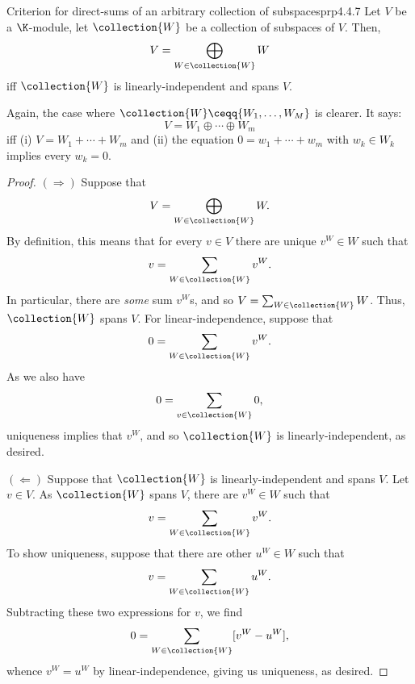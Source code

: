 \begin{prp}{Criterion for direct-sums of an arbitrary collection of subspaces}{prp4.4.7}
	Let $V$ be a $\K$-module, let $\collection{W}$ be a collection of subspaces of $V$.  Then,
	\begin{equation}
		V=\bigoplus _{W\in \collection{W}}W
	\end{equation}
	iff $\collection{W}$ is linearly-independent and spans $V$.
	\begin{rmk}
		Again, the case where $\collection{W}\ceqq \{ W_1,\ldots ,W_M\}$ is clearer.  It says:
		\begin{equation}
			V=W_1\oplus \cdots \oplus W_m
		\end{equation}
		iff (i) $V=W_1+\cdots +W_m$ and (ii) the equation $0=w_1+\cdots +w_m$ with $w_k\in W_k$ implies every $w_k=0$.
	\end{rmk}
	\begin{proof}
		$(\Rightarrow )$ Suppose that
		\begin{equation}
			V=\bigoplus _{W\in \collection{W}}W.
		\end{equation}
		By definition, this means that for every $v\in V$ there are unique $v^W\in W$ such that
		\begin{equation}
			v=\sum _{W\in \collection{W}}v^W.
		\end{equation}
		In particular, there are \emph{some} sum $v^W$s, and so $V=\sum _{W\in \collection{W}}W$.  Thus, $\collection{W}$ spans $V$.  For linear-independence, suppose that
		\begin{equation}
			0=\sum _{W\in \collection{W}}v^W.
		\end{equation}
		As we also have
		\begin{equation}
			0=\sum _{v\in \collection{W}}0,
		\end{equation}
		uniqueness implies that $v^W$, and so $\collection{W}$ is linearly-independent, as desired.
		
		\blni
		$(\Leftarrow )$ Suppose that $\collection{W}$ is linearly-independent and spans $V$.  Let $v\in V$.  As $\collection{W}$ spans $V$, there are $v^W\in W$ such that
		\begin{equation}
			v=\sum _{W\in \collection{W}}v^W.
		\end{equation}
		To show uniqueness, suppose that there are other $u^W\in W$ such that
		\begin{equation}
			v=\sum _{W\in \collection{W}}u^W.
		\end{equation}
		Subtracting these two expressions for $v$, we find
		\begin{equation}
			0=\sum _{W\in \collection{W}}[v^W-u^W],
		\end{equation}
		whence $v^W=u^W$ by linear-independence, giving us uniqueness, as desired.
	\end{proof}
\end{prp}
